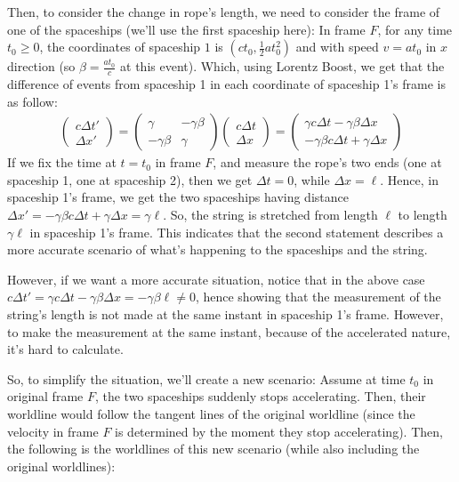 \documentclass{article}
\begin{document}
\hfil

Then, to consider the change in rope's length, we need to consider the frame of one of the spaceships (we'll use the first spaceship here): In frame $F$, for any time $t_0\geq 0$, the coordinates of spaceship $1$ is $(ct_0, \frac{1}{2}at_0^2)$ and with speed $v=at_0$ in $x$ direction (so $\beta = \frac{at_0}{c}$ at this event). Which, using Lorentz Boost, we get that the difference of events from spaceship 1 in each coordinate of spaceship 1's frame is as follow:
\begin{align}
    \begin{pmatrix}
        c\Delta t'\\\Delta x'
    \end{pmatrix} = \begin{pmatrix}
        \gamma & -\gamma\beta\\ -\gamma\beta&\gamma
    \end{pmatrix}\begin{pmatrix}
        c\Delta t\\\Delta x
    \end{pmatrix} = \begin{pmatrix}
        \gamma c\Delta t-\gamma\beta \Delta x\\ -\gamma\beta c\Delta t + \gamma\Delta x
    \end{pmatrix}
\end{align}
If we fix the time at $t=t_0$ in frame $F$, and measure the rope's two ends (one at spaceship 1, one at spaceship 2), then we get $\Delta t=0$, while $\Delta x=\ell$. Hence, in spaceship 1's frame, we get the two spaceships having distance $\Delta x' = -\gamma\beta c\Delta t+\gamma\Delta x = \gamma \ell$. So, the string is stretched from length $\ell$ to length $\gamma\ell$ in spaceship 1's frame. This indicates that the second statement describes a more accurate scenario of what's happening to the spaceships and the string.

\hfil

However, if we want a more accurate situation, notice that in the above case $c\Delta t' = \gamma c\Delta t-\gamma\beta \Delta x = -\gamma\beta\ell \neq 0$, hence showing that the measurement of the string's length is not made at the same instant in spaceship 1's frame. However, to make the measurement at the same instant, because of the accelerated nature, it's hard to calculate.

So, to simplify the situation, we'll create a new scenario: Assume at time $t_0$ in original frame $F$, the two spaceships suddenly stops accelerating. Then, their worldline would follow the tangent lines of the original worldline (since the velocity in frame $F$ is determined by the moment they stop accelerating). Then, the following is the worldlines of this new scenario (while also including the original worldlines):
\end{document}
